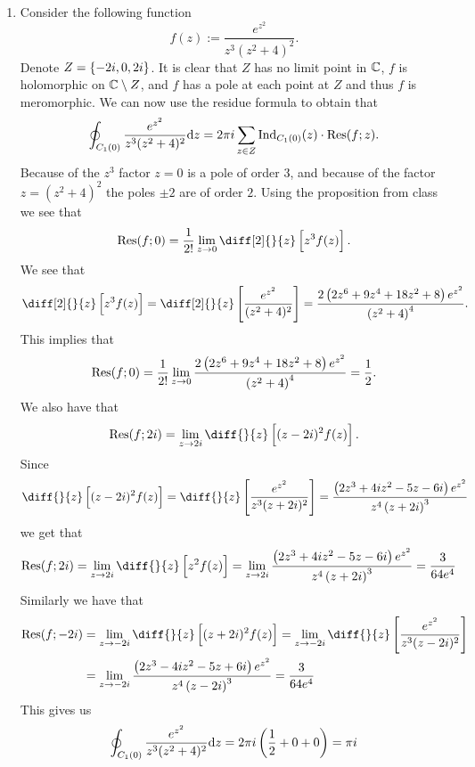 \documentclass[11pt,a4paper]{article}
\begin{document}
\begin{solution} \phantom{}
\begin{enumerate}
  \item[(1)] Consider the following function
    \[
      f(z) := \frac{e^{z^2}}{z^3 (z^2 + 4)^2}.
    \]
    Denote $Z = \left\{-2i,0,2i\right\}$.
    It is clear that $Z$ has no limit point in $\mathbb{C}$,
    $f$ is holomorphic on $\mathbb{C} \setminus Z$,
    and $f$ has a pole at each point at $Z$ and thus $f$ is meromorphic.
    We can now use the residue formula to obtain that
    \[
      \oint_{C_1(0)} \frac{e^{z^2}}{z^3 (z^2 + 4)^2} \mathrm{d} z =
      2 \pi i \sum_{z \in Z} \operatorname{Ind}_{C_1(0)}(z) \cdot \operatorname{Res}(f;z). 
    \]
    Because of the $z^3$ factor $z = 0$ is a pole of order $3$,
    and because of the factor $z = (z^2 + 4)^2$ the poles $\pm 2$
    are of order $2$.
    Using the proposition from class we see that
    \[
      \Res(f;0) = \frac{1}{2!} \lim_{z \to 0} \diff[2]{}{z}
      \left[z^3 f(z)\right].
    \]
    We see that
    \[
      \diff[2]{}{z} \left[z^3 f(z)\right] =
      \diff[2]{}{z} \left[\frac{e^{z^2}}{(z^2 + 4)^2}\right] =
      \frac{2 \left(2z^{6} + 9z^{4} + 18z^{2} + 8\right)
      e^{z^{2}}}{\left(z^{2} + 4\right)^{4}}.
    \]
    This implies that
    \[
      \operatorname{Res}(f;0) = \frac{1}{2!} \lim_{z \to 0} 
      \frac{2 \left(2z^{6} + 9z^{4} + 18z^{2} + 8\right)
      e^{z^{2}}}{\left(z^{2} + 4\right)^{4}} = \frac{1}{2}.
    \]
    We also have that
    \[
      \Res(f;2i) = \lim_{z \to 2i} \diff{}{z} \left[(z - 2i)^2 f(z)\right].
    \]
    Since
    \[
      \diff{}{z} \left[(z - 2i)^2 f(z)\right] =
      \diff{}{z} \left[\frac{e^{z^2}}{z^3 (z + 2i)^2}\right] =
      \frac{\left(2z^{3} + 4i z^{2} - 5z - 6i\right) e^{z^{2}}}{z^{4} \left(z + 2i \right)^{3}}
    \]
    we get that
    \[
      \Res(f;2i) =
      \lim_{z \to 2i} \diff{}{z} \left[z^2 f(z)\right] =
      \lim_{z \to 2i} 
      \frac{\left(2z^{3} + 4i z^{2} - 5z - 6i\right) e^{z^{2}}}{z^{4} \left(z + 2i \right)^{3}} =
      \frac{3}{64 e^4}
    \]
    Similarly we have that
    \begin{align*}
      \Res(f;-2i) &=
      \lim_{z \to -2i} 
      \diff{}{z} \left[(z + 2i)^2 f(z)\right] =
      \lim_{z \to -2i} 
      \diff{}{z} \left[\frac{e^{z^2}}{z^3 (z - 2i)^2}\right] \\ &=
      \lim_{z \to -2i} 
      \frac{\left(2z^{3} - 4i z^{2} - 5z + 6i \right) e^{z^{2}}}{z^{4} \left(z - 2i\right)^{3}} =
      \frac{3}{64 e^4}
    \end{align*}
    This gives us
    \[
      \oint_{C_1(0)} \frac{e^{z^2}}{z^3 (z^2 + 4)^2} \dz =
      2 \pi i \del{\half + 0 + 0} = \pi i
\]
\end{enumerate}
\end{solution}
\end{document}
